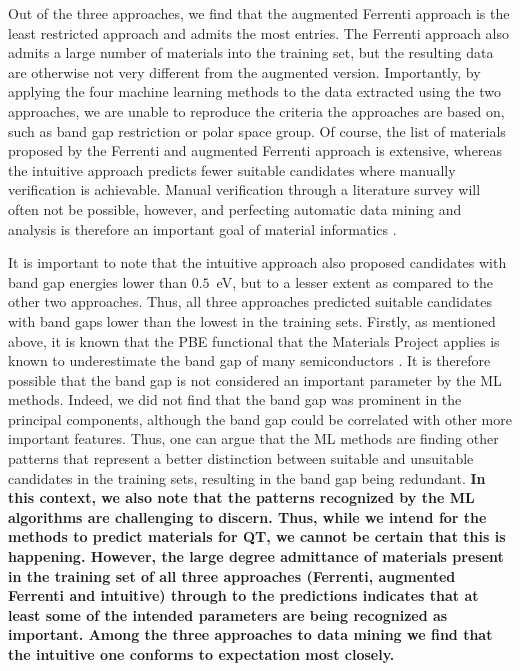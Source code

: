 \documentclass[superscriptaddress,unsortedaddress,
 amsmath,amssymb,
 aps,
]{revtex4-2}
\begin{document}
Out of the three approaches, we find that the augmented Ferrenti approach is the least restricted approach and admits the most entries. The Ferrenti approach also admits a large number of materials into the training set, but the resulting data are otherwise not very different from the augmented version. 
Importantly, by applying the four machine learning methods to the data extracted using the two approaches, we are unable to reproduce the criteria the approaches are based on, such as band gap restriction or polar space group. Of course, the list of materials proposed by the Ferrenti and augmented Ferrenti approach is extensive, whereas the intuitive approach predicts fewer suitable candidates where manually verification is achievable.  
Manual verification through a literature survey will often not be possible, however, and perfecting automatic data mining and analysis is therefore an important goal of material informatics \cite{rickman2019}. 

It is important to note that the intuitive approach also proposed candidates with band gap energies lower than $0.5$~eV, but to a lesser extent as compared to the other two approaches. Thus, all three approaches predicted suitable candidates with band gaps lower than the lowest in the training sets. 
Firstly, as mentioned above, it is known that the PBE functional that the Materials Project applies is known to underestimate the band gap of many semiconductors \cite{Freysoldt2014}. 
It is therefore possible that the band gap is not considered an important parameter by the ML methods. 
Indeed, we did not find that the band gap was prominent in the principal components, although the band gap could be correlated with other more important features. 
Thus, one can argue that the ML methods are finding  other patterns that represent a better distinction between suitable and unsuitable candidates in the training sets, resulting in the band gap being redundant.
\textbf{In this context, we also note that the patterns recognized by the ML algorithms are challenging to discern. Thus, while we intend for the methods to predict materials for QT, we cannot be certain that this is happening. 
However, the large degree admittance of materials present in the training set of all three approaches (Ferrenti, augmented Ferrenti and intuitive)  through to the predictions indicates that at least some of the intended parameters are being recognized as important.  
Among the three approaches to data mining we find that the intuitive one conforms to expectation most closely. }
\end{document}

